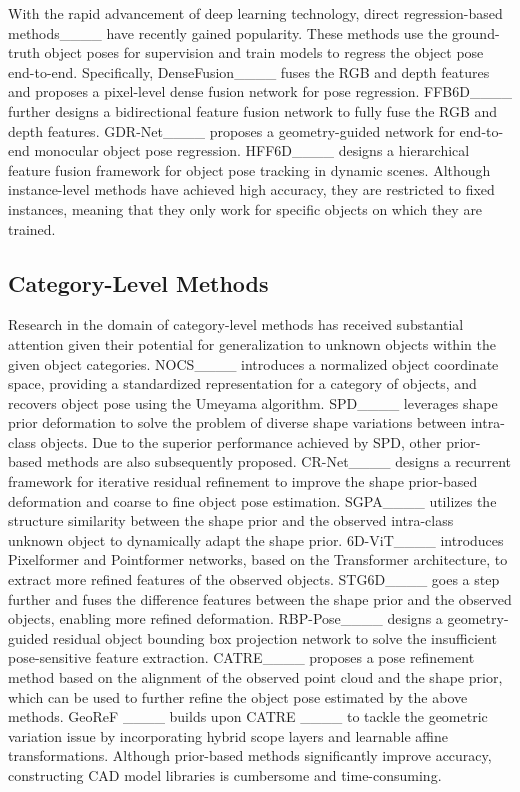 \par With the rapid advancement of deep learning technology, direct regression-based methods____ have recently gained popularity. These methods use the ground-truth object poses for supervision and train models to regress the object pose end-to-end. Specifically, DenseFusion____ fuses the RGB and depth features and proposes a pixel-level dense fusion network for pose regression. FFB6D____ further designs a bidirectional feature fusion network to fully fuse the RGB and depth features. GDR-Net____ proposes a geometry-guided network for end-to-end monocular object pose regression. HFF6D____ designs a hierarchical feature fusion framework for object pose tracking in dynamic scenes. Although instance-level methods have achieved high accuracy, they are restricted to fixed instances, meaning that they only work for specific objects on which they are trained.

\vspace{-1em}
\subsection{Category-Level Methods}
Research in the domain of category-level methods has received substantial attention given their potential for generalization to unknown objects within the given object categories. 
NOCS____ introduces a normalized object coordinate space, providing a standardized representation for a category of objects, and recovers object pose using the Umeyama algorithm. SPD____ leverages shape prior deformation to solve the problem of diverse shape variations between intra-class objects. Due to the superior performance achieved by SPD, other prior-based methods are also subsequently proposed. CR-Net____ designs a recurrent framework for iterative residual refinement to improve the shape prior-based deformation and coarse to fine object pose estimation. SGPA____ utilizes the structure similarity between the shape prior and the observed intra-class unknown object to dynamically adapt the shape prior. 6D-ViT____ introduces Pixelformer and Pointformer networks, based on the Transformer architecture, to extract more refined features of the observed objects. STG6D____ goes a step further and fuses the difference features between the shape prior and the observed objects, enabling more refined deformation. RBP-Pose____ designs a geometry-guided residual object bounding box projection network to solve the insufficient pose-sensitive feature extraction.
CATRE____ proposes a pose refinement method based on the alignment of the observed point cloud and the shape prior, which can be used to further refine the object pose estimated by the above methods. GeoReF ____ builds upon CATRE ____ to tackle the geometric variation issue by incorporating hybrid scope layers and learnable affine transformations. Although prior-based methods significantly improve accuracy, constructing CAD model libraries is cumbersome and time-consuming. 

